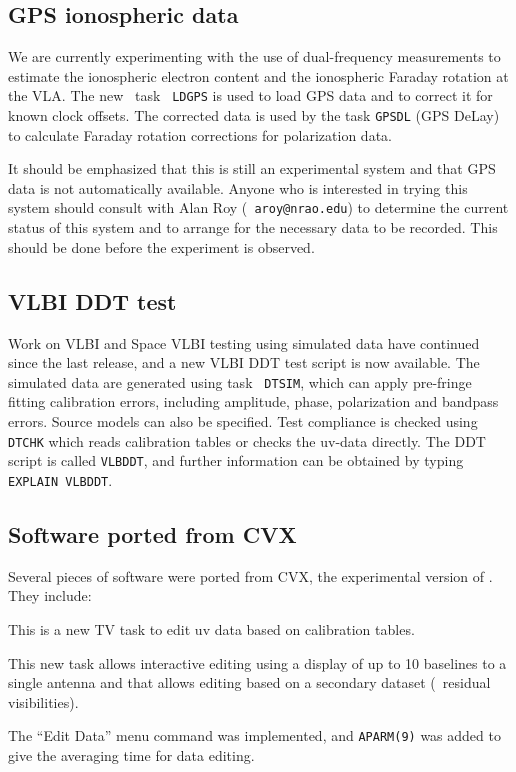 \subsection{GPS ionospheric data}

We are currently experimenting with the use of dual-frequency
measurements to estimate the ionospheric electron content and the
ionospheric Faraday rotation at the VLA.  The new \AIPS\ task {\tt
LDGPS} is used to load GPS data and to correct it for known clock
offsets.  The corrected data is used by the task {\tt GPSDL} (GPS
DeLay) to calculate Faraday rotation corrections for polarization
data.

It should be emphasized that this is still an experimental system and
that GPS data is not automatically available.  Anyone who is
interested in trying this system should consult with Alan Roy ({\tt
aroy@nrao.edu}) to determine the current status of this system and to
arrange for the necessary data to be recorded.  This should be done
before the experiment is observed.


\subsection{VLBI DDT test}

Work on VLBI and Space VLBI testing using simulated data have
continued since the last release, and a new VLBI DDT test script is
now available.  The simulated data are generated using task {\tt
DTSIM}, which can apply pre-fringe fitting calibration errors,
including amplitude, phase, polarization and bandpass errors.  Source
models can also be specified.  Test compliance is checked using {\tt
DTCHK} which reads calibration tables or checks the uv-data directly.
The DDT script is called {\tt VLBDDT}, and further information can be
obtained by typing {\tt EXPLAIN VLBDDT}.



\subsection{Software ported from CVX}

Several pieces of software were ported from CVX, the experimental
version of \AIPS.  They include:

\begin{description}

 This is a new TV task to edit uv data based on
calibration tables.

 This new task allows interactive editing using a
display of up to 10 baselines to a single antenna and that allows
editing based on a secondary dataset (\eg\ residual visibilities).

 The ``Edit Data'' menu command was implemented, and
{\tt APARM(9)} was added to give the averaging time for data editing.

\end{description}


